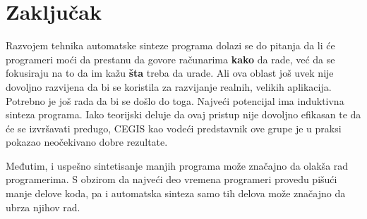 \section{Zaključak}
\label{sec:zakljucak}

Razvojem tehnika automatske sinteze programa dolazi se do pitanja da li će programeri moći da prestanu da govore računarima \textbf{kako} da rade, već da se fokusiraju na to da im kažu \textbf{šta} treba da urade. Ali ova oblast još uvek nije dovoljno razvijena da bi se koristila za razvijanje realnih, velikih aplikacija. Potrebno je još rada da bi se došlo do toga. Najveći potencijal ima induktivna sinteza programa. 
Iako teorijski deluje da ovaj pristup nije dovoljno efikasan te da će se izvršavati predugo, CEGIS kao vodeći predstavnik ove grupe je u praksi pokazao neočekivano dobre rezultate.

Međutim, i uspešno sintetisanje manjih programa može značajno da olakša rad programerima. S obzirom da najveći deo vremena programeri provedu pišući manje delove koda, pa i automatska sinteza samo tih delova može značajno da ubrza njihov rad.
